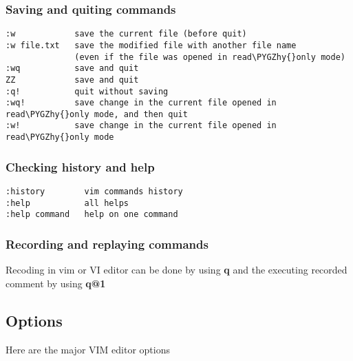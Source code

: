 \documentclass[letterpaper,10pt,english]{sphinxmanual}
\def\PYGZhy{\char`\-}
\begin{document}
\subsubsection{Saving and quiting commands}
\label{editor/vim:saving-and-quiting-commands}
\begin{Verbatim}[commandchars=\\\{\}]
:w            save the current file (before quit)
:w file.txt   save the modified file with another file name
              (even if the file was opened in read\PYGZhy{}only mode)
:wq           save and quit
ZZ            save and quit
:q!           quit without saving
:wq!          save change in the current file opened in read\PYGZhy{}only mode, and then quit
:w!           save change in the current file opened in read\PYGZhy{}only mode
\end{Verbatim}


\subsubsection{Checking history and help}
\label{editor/vim:checking-history-and-help}
\begin{Verbatim}[commandchars=\\\{\}]
:history        vim commands history
:help           all helps
:help command   help on one command
\end{Verbatim}


\subsubsection{Recording and replaying commands}
\label{editor/vim:recording-and-replaying-commands}
Recoding in vim or VI editor can be done by using \textbf{q} and the executing recorded comment by using \textbf{q@1}


\subsection{Options}
\label{editor/vim:options}
Here are the major VIM editor options
\end{document}
